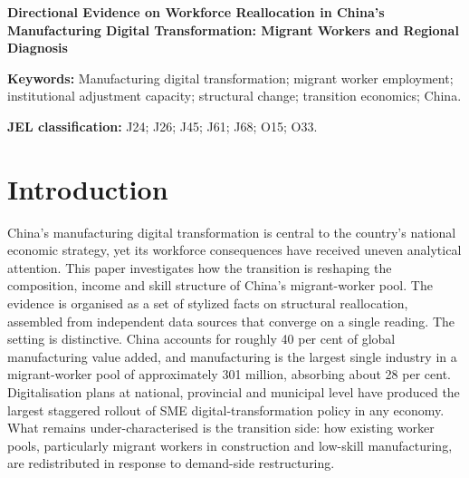 \documentclass[12pt]{article}
\begin{document}
\begin{center}
{\Large\bfseries Directional Evidence on Workforce Reallocation in China's Manufacturing Digital Transformation: Migrant Workers and Regional Diagnosis}
\end{center}

\begin{abstract}
This paper asks whether automation in China's manufacturing digital transformation replaces jobs or workers. Using migrant-worker survey data (2021--2025), the three-batch 101-city SME digitalisation pilot and an eleven-country panel, it finds that manufacturing's migrant-worker share rose 1.1 percentage points while construction fell 5.2, that the manufacturing gain of 5.66 million workers is reallocation-led ($\gamma=0.586$), and that within-sector skill upgrade accounts for 84 per cent of the quality-adjusted gain. The transition is a reallocation-led skill upgrade, not displacement. Its cost is governed by institutional adjustment capacity (interaction $0.054$, $p=0.0002$), not robot intensity; the binding constraint is training supply, not worker willingness.
\end{abstract}

\noindent\textbf{Keywords:} Manufacturing digital transformation; migrant worker employment; institutional adjustment capacity; structural change; transition economics; China.

\noindent\textbf{JEL classification:} J24; J26; J45; J61; J68; O15; O33.

\section{Introduction}

China's manufacturing digital transformation is central to the country's national economic strategy, yet its workforce consequences have received uneven analytical attention. This paper investigates how the transition is reshaping the composition, income and skill structure of China's migrant-worker pool. The evidence is organised as a set of stylized facts on structural reallocation, assembled from independent data sources that converge on a single reading. The setting is distinctive. China accounts for roughly 40 per cent of global manufacturing value added, and manufacturing is the largest single industry in a migrant-worker pool of approximately 301 million, absorbing about 28 per cent. Digitalisation plans at national, provincial and municipal level have produced the largest staggered rollout of SME digital-transformation policy in any economy. What remains under-characterised is the transition side: how existing worker pools, particularly migrant workers in construction and low-skill manufacturing, are redistributed in response to demand-side restructuring.
\end{document}
